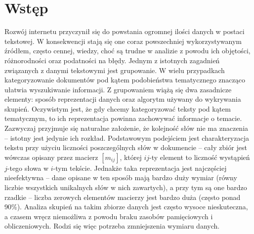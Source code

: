 \documentclass{praca1}
\begin{document}
  \tableofcontents

\chapter{Wstęp}



Rozwój internetu przyczynił się do powstania ogromnej ilości danych w postaci tekstowej. W konsekwencji stają się one coraz powszechniej wykorzystywanym źródłem, często cennej, wiedzy, choć są trudne w analizie z powodu ich objętości, różnorodności oraz podatności na błędy. %
Jednym z istotnych zagadnień związanych z danymi tekstowymi jest grupowanie. W wielu przypadkach kategoryzowanie dokumentów pod kątem podobieństwa tematycznego znacząco ułatwia wyszukiwanie informacji. Z grupowaniem wiążą się dwa zasadnicze elementy: sposób reprezentacji danych oraz algorytm używany do wykrywania skupień. Oczywistym jest, że gdy chcemy kategoryzować teksty pod kątem tematycznym, to ich reprezentacja powinna zachowywać informacje o temacie. Zazwyczaj przyjmuje się naturalne założenie, że kolejność słów nie ma znaczenia -- istotny jest jedynie ich rozkład. Podstawowym podejściem jest charakteryzacja tekstu przy użyciu liczności poszczególnych słów w dokumencie -- cały zbiór jest wówczas opisany przez macierz $[m_{ij}]$, której $ij$-ty element to liczność wystąpień $j$-tego słowa w $i$-tym tekście. Jednakże taka reprezentacja jest najczęściej nieefektywna -- dane opisane w ten sposób mają bardzo duży wymiar (równy liczbie wszystkich unikalnych słów w nich zawartych), a przy tym są one bardzo rzadkie -- liczba zerowych elementów macierzy jest bardzo duża (często ponad 90\%). Analiza skupień na takim zbiorze danych jest często wysoce nieskuteczna, a czasem wręcz niemożliwa z powodu braku zasobów pamięciowych i obliczeniowych. Rodzi się więc potrzeba zmniejszenia wymiaru danych.
\end{document}
